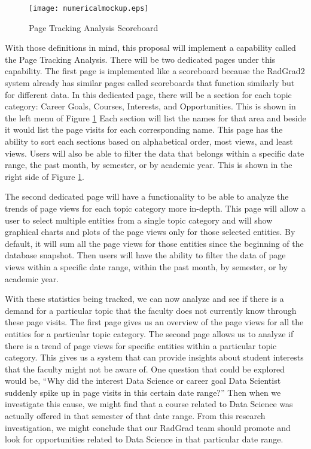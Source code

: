 \documentclass[english]{proposalnsf}
\begin{document}
  \begin{figure}[h]
    \texttt{[image: numericalmockup.eps]}
    \caption{Page Tracking Analysis Scoreboard}
    \label{fig:page-tracking-analysis-scoreboard}
  \end{figure}

  With those definitions in mind, this proposal will implement a capability called the Page Tracking Analysis. There
  will be two dedicated pages under this capability. The first page is implemented like a scoreboard because the
  RadGrad2 system already has similar pages called scoreboards that function similarly but for different data. In this
  dedicated page, there will be a section for each topic category: Career Goals, Courses, Interests, and Opportunities.
  This is shown in the left menu of Figure \ref{fig:page-tracking-analysis-scoreboard} Each section will list the names
  for that area and beside it would list the page visits for each corresponding name. This page has the ability to sort
  each sections based on alphabetical order, most views, and least views. Users will also be able to filter the data
  that belongs within a specific date range, the past month, by semester, or by academic year. This is shown in the right
  side of Figure \ref{fig:page-tracking-analysis-scoreboard}.

  The second dedicated page will have a functionality to be able to analyze the trends of page views for each topic
  category more in-depth. This page will allow a user to select multiple entities from a single topic category and will
  show graphical charts and plots of the page views only for those selected entities. By default, it will sum all the
  page views for those entities since the beginning of the database snapshot. Then users will have the ability to filter
  the data of page views within a specific date range, within the past month, by semester, or by academic year.


  With these statistics being tracked, we can now analyze and see if there is a demand for a particular topic that the
  faculty does not currently know through these page visits. The first page gives us an overview of the page views
  for all the entities for a particular topic category. The second page allows us to analyze if there is a trend of page
  views for specific entities within a particular topic category. This gives us a system that can provide insights about
  student interests that the faculty might not be aware of. One question that could be explored would be, ``Why did
  the interest Data Science or career goal Data Scientist suddenly spike up in page visits in this certain
  date range?'' Then when we investigate this cause, we might find that a course related to Data Science was actually
  offered in that semester of that date range. From this research investigation, we might conclude that our RadGrad
  team should promote and look for opportunities related to Data Science in that particular date range.
\end{document}
